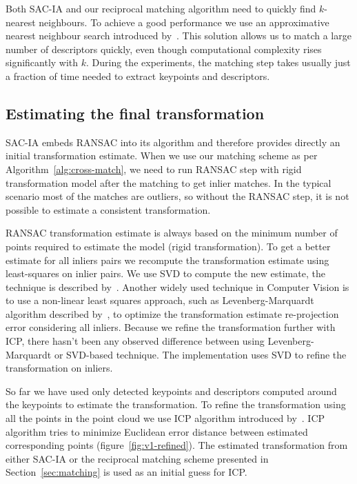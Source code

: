 Both \gls{SAC-IA} and our reciprocal matching algorithm need to quickly find $k$-nearest neighbours. To achieve a good performance we use an approximative nearest neighbour search introduced by~\citet{muja2014flann}. This solution allows us to match a large number of descriptors quickly, even though computational complexity rises significantly with $k$. During the experiments, the matching step takes usually just a fraction of time needed to extract keypoints and descriptors.

\subsection{Estimating the final transformation}
\label{sec:final-estimation}

\gls{SAC-IA} embeds \gls{RANSAC} into its algorithm and therefore provides directly an initial transformation estimate. When we use our matching scheme as per Algorithm~\ref{alg:cross-match}, we need to run \gls{RANSAC} step with rigid transformation model after the matching to get inlier matches. In the typical scenario most of the matches are outliers, so without the \gls{RANSAC} step, it is not possible to estimate a consistent transformation.

\gls{RANSAC} transformation estimate is always based on the minimum number of points required to estimate the model (rigid transformation). To get a better estimate for all inliers pairs we recompute the transformation estimate using least-squares on inlier pairs. We use \gls{SVD} to compute the new estimate, the technique is described by~\citet{golub1970svd}. Another widely used technique in Computer Vision is to use a non-linear least squares approach, such as Levenberg-Marquardt algorithm described by~\citet{more1978levmarq}, to optimize the transformation estimate re-projection error considering all inliers. Because we refine the transformation further with \gls{ICP}, there hasn't been any observed difference between using Levenberg-Marquardt or \gls{SVD}-based technique. The implementation uses \gls{SVD} to refine the transformation on inliers.

So far we have used only detected keypoints and descriptors computed around the keypoints to estimate the transformation. To refine the transformation using all the points in the point cloud we use \gls{ICP} algorithm introduced by~\citet{besl1992icp}. \gls{ICP} algorithm tries to minimize Euclidean error distance between estimated corresponding points (figure~\ref{fig:v1-refined}). The estimated transformation from either \gls{SAC-IA} or the reciprocal matching scheme presented in Section~\ref{sec:matching} is used as an initial guess for \gls{ICP}.

